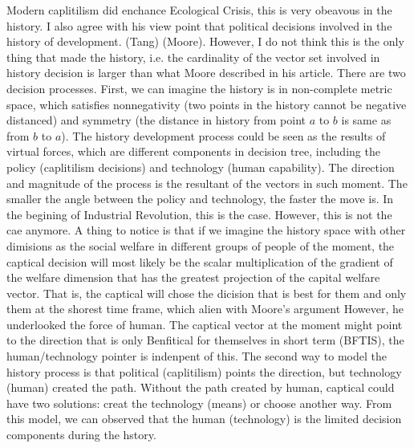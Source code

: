 \documentclass[12pt]{article}
\newcommand{\IR}{Industrial Revolution}
\newcommand{\EC}{Ecological Crisis}
\begin{document}
\begin{flushleft}
Modern caplitilism did enchance \EC, this is very obeavous in the history. I also agree with his view point that political decisions involved in the history of development. (Tang) (Moore). However, I do not think this is the only thing that made the history, i.e. the cardinality of the vector set involved in history decision is larger than what Moore described in his article. There are two decision processes. First, we can imagine the history is in non-complete metric space, which satisfies nonnegativity (two points in the history cannot be negative distanced) and symmetry (the distance in history from point $a$ to $b$ is same as from $b$ to $a$).
The history development process could be seen as the results of virtual forces, which are different components in decision tree, including the policy (caplitilism decisions) and technology (human capability). The direction and magnitude of the process is the resultant of the vectors in such moment. The smaller the angle between the policy and technology, the faster the move is. In the begining of \IR, this is the case. However, this is not the cae anymore. A thing to notice is that if we imagine the history space with other dimisions as the social welfare in different groups of people of the moment, the captical decision will most likely be the scalar multiplication of the gradient of the welfare dimension that has the greatest projection of the capital welfare vector. That is, the captical will chose the dicision that is best for them and only them at the shorest time frame, which alien with Moore's argument However, he underlooked the force of human.
The captical vector at the moment might point to the direction that is only Benfitical for themselves in short term (BFTIS), the human/technology pointer is indenpent of this. The second way to model the history process is that political (caplitilism) points the direction, but technology (human) created the path. Without the path created by human, captical could have two solutions: creat the technology (means) or choose another way. From this model, we can observed that the human (technology) is the limited decision components during the hstory.



\end{flushleft}
\end{document}
